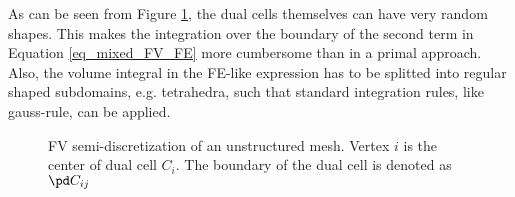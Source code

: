 \documentclass[../main.tex]{subfiles}
\begin{document}
\vskip 1cm 
As can be seen from Figure \ref{fig:dualcell_unstructured}, the dual cells themselves can have very random shapes. This makes the integration over the boundary of the second term in Equation \eqref{eq_mixed_FV_FE} more cumbersome than in a primal approach. Also, the volume integral in the \ac{FE}-like expression has to be splitted into regular shaped subdomains, e.g. tetrahedra, such that standard integration rules, like gauss-rule, can be applied.




\begin{figure}[h]
\centering

\caption{\ac{FV} semi-discretization of an unstructured mesh. Vertex $i$ is the center of dual cell $C_i$. The boundary of the dual cell is denoted as $\pd C_{ij}$}
\label{fig:dualcell_unstructured}
\end{figure}
\end{document}
